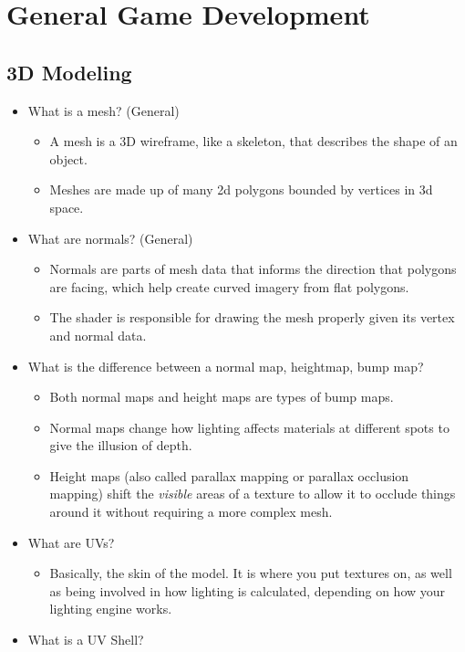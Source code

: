 \documentclass{article}
\begin{document}
\newpage
\section{General Game Development}
\subsection{3D Modeling}
\begin{itemize}
    \item What is a mesh? (General)
    \begin{itemize}
        \item A mesh is a 3D wireframe, like a skeleton, that describes the shape of an object.
        \item Meshes are made up of many 2d polygons bounded by vertices in 3d space.
    \end{itemize}
    \item What are normals? (General)
    \begin{itemize}
        \item Normals are parts of mesh data that informs the direction that polygons are facing, which help create curved imagery from flat polygons.
        \item The shader is responsible for drawing the mesh properly given its vertex and normal data.
    \end{itemize}
    \item What is the difference between a normal map, heightmap, bump map?
    \begin{itemize}
        \item Both normal maps and height maps are types of bump maps.
        \item Normal maps change how lighting affects materials at different spots to give the illusion of depth.
        \item Height maps (also called parallax mapping or parallax occlusion mapping) shift the \textit{visible} areas of a texture to allow it to occlude things around it without requiring a more complex mesh.
    \end{itemize}
    \item What are UVs?
    \begin{itemize}
        \item Basically, the skin of the model. It is where you put textures on, as well as being involved in how lighting is calculated, depending on how your lighting engine works.
    \end{itemize}
    \item What is a UV Shell?

\end{itemize}
\end{document}
